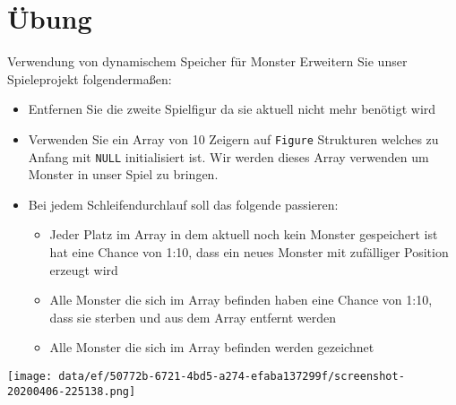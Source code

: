 \documentclass[presentation]{beamer}
\begin{document}
\section{Übung}
\label{sec:org89f2792}
\begin{frame}[label={sec:org7b8be16},fragile]{Verwendung von dynamischem Speicher für Monster}
 \footnotesize
Erweitern Sie unser Spieleprojekt folgendermaßen:
\begin{itemize}
\item \alert{Entfernen Sie die zweite Spielfigur} da sie aktuell nicht mehr
benötigt wird
\item Verwenden Sie ein \alert{Array} von 10 Zeigern auf {\color{solarizedYellow}\verb!Figure!} Strukturen
welches zu Anfang mit {\color{solarizedYellow}\verb!NULL!} \alert{initialisiert} ist. Wir werden dieses
Array verwenden um \alert{Monster} in unser Spiel zu bringen.
\item Bei \alert{jedem Schleifendurchlauf} soll das folgende passieren:
\begin{itemize}
\item Jeder Platz im Array in dem aktuell noch kein Monster gespeichert
ist hat eine Chance von 1:10, dass ein \alert{neues Monster} mit
zufälliger Position erzeugt wird
\item Alle Monster die sich im Array befinden haben eine Chance von
1:10, dass sie \alert{sterben und aus dem Array entfernt} werden
\item Alle Monster die sich im Array befinden \alert{werden gezeichnet}
\end{itemize}
\end{itemize}
\begin{center}
\texttt{[image: data/ef/50772b-6721-4bd5-a274-efaba137299f/screenshot-20200406-225138.png]}
\end{center}
\end{frame}
\end{document}
